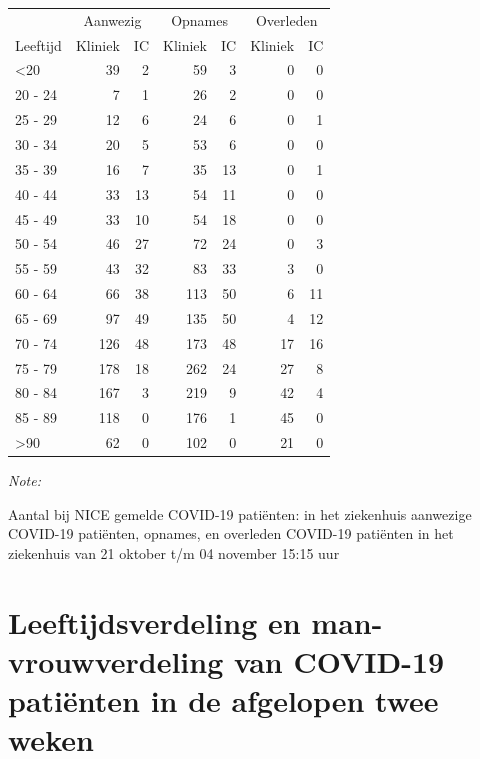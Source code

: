 \documentclass[
  english,
  man,floatsintext]{apa6}
\begin{document}
\begin{table}
\centering\begingroup\fontsize{10}{12}\selectfont

\begin{threeparttable}
\begin{tabular}{lrrrrrr}
\toprule
\multicolumn{1}{c}{ } & \multicolumn{2}{c}{Aanwezig} & \multicolumn{2}{c}{Opnames} & \multicolumn{2}{c}{Overleden} \\
\cmidrule(l{3pt}r{3pt}){2-3} \cmidrule(l{3pt}r{3pt}){4-5} \cmidrule(l{3pt}r{3pt}){6-7}
Leeftijd & Kliniek & IC & Kliniek & IC & Kliniek & IC\\
\midrule
<20 & 39 & 2 & 59 & 3 & 0 & 0\\
20 - 24 & 7 & 1 & 26 & 2 & 0 & 0\\
25 - 29 & 12 & 6 & 24 & 6 & 0 & 1\\
30 - 34 & 20 & 5 & 53 & 6 & 0 & 0\\
35 - 39 & 16 & 7 & 35 & 13 & 0 & 1\\
40 - 44 & 33 & 13 & 54 & 11 & 0 & 0\\
45 - 49 & 33 & 10 & 54 & 18 & 0 & 0\\
50 - 54 & 46 & 27 & 72 & 24 & 0 & 3\\
55 - 59 & 43 & 32 & 83 & 33 & 3 & 0\\
60 - 64 & 66 & 38 & 113 & 50 & 6 & 11\\
65 - 69 & 97 & 49 & 135 & 50 & 4 & 12\\
70 - 74 & 126 & 48 & 173 & 48 & 17 & 16\\
75 - 79 & 178 & 18 & 262 & 24 & 27 & 8\\
80 - 84 & 167 & 3 & 219 & 9 & 42 & 4\\
85 - 89 & 118 & 0 & 176 & 1 & 45 & 0\\
>90 & 62 & 0 & 102 & 0 & 21 & 0\\
\bottomrule
\end{tabular}
\begin{tablenotes}
\item \textit{Note: } 
\item Aantal bij NICE gemelde COVID-19 patiënten: in het ziekenhuis aanwezige COVID-19 patiënten, opnames, en overleden COVID-19 patiënten in het ziekenhuis van 21 oktober t/m 04 november 15:15 uur
\end{tablenotes}
\end{threeparttable}
\endgroup{}
\end{table}

\newpage

\hypertarget{leeftijdsverdeling-en-man-vrouwverdeling-van-covid-19-patiuxebnten-in-de-afgelopen-twee-weken}{%
\section{Leeftijdsverdeling en man-vrouwverdeling van COVID-19 patiënten in de afgelopen twee weken}\label{leeftijdsverdeling-en-man-vrouwverdeling-van-covid-19-patiuxebnten-in-de-afgelopen-twee-weken}}
\end{document}
